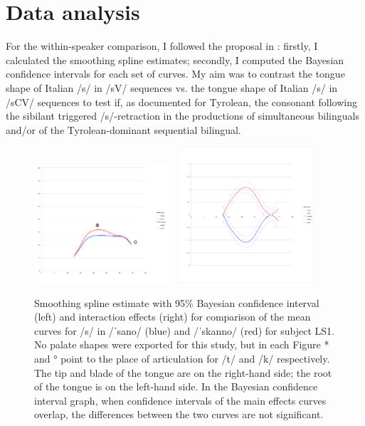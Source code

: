 \documentclass[output=paper]{LSP/langsci}
\begin{document}
\section{Data analysis}
For the within-speaker comparison, I followed the proposal in \citet{davidson_comparing_2006}: firstly, I calculated the smoothing spline estimates; secondly, I computed the Bayesian confidence intervals for each set of curves. My aim was to contrast the tongue shape of Italian /s/ in /sV/ sequences vs. the tongue shape of Italian /s/ in /sCV/ sequences to test if, as documented for Tyrolean, the consonant following the sibilant triggered /s/-retraction in the productions of simultaneous bilinguals and/or of the Tyrolean-dominant sequential bilingual.


\begin{figure}[p]
\includegraphics[width=0.45\textwidth]{illustrations/sprea_fig1a}~
\includegraphics[width=0.45\textwidth,trim=4 32 4 12,clip]{illustrations/sprea_fig1b}
\caption{Smoothing spline estimate with 95\% Bayesian confidence interval (left) and interaction effects (right) for comparison of the mean curves for /s/ in /ˈsano/ (blue) and /ˈskanno/ (red) for subject LS1. No palate shapes were exported for this study, but in each Figure * and ° point to the place of articulation for /t/ and /k/ respectively. The tip and blade of the tongue are on the right-hand side; the root of the tongue is on the left-hand side. In the Bayesian confidence interval graph, when confidence intervals of the main effects curves overlap, the differences between the two curves are not significant.} 
\label{fig:sprea:1}   
\end{figure}
\end{document}
